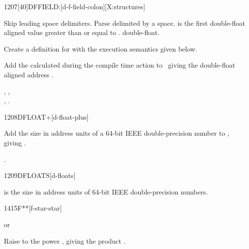 
\begin{worddef}{1207}[40]{DFFIELD:}[d-f-field-colon][X:structures]
\item {}

	Skip leading space delimiters. Parse  delimited by
	a space.  is the first double-float aligned value
	greater than or equal to .  
	double-float.

	Create a definition for  with the execution semantics
	given below.

\execute[name]
\cbstart{}
\cbend

	Add the  calculated during the compile time action to
\cbstart{}\cbend\ 
	giving the double-float aligned address
\cbstart{}.\cbend

\see {},
	, \\
	,
	.
\end{worddef}


\begin{worddef}{1208}{DFLOAT+}[d-float-plus]
\item {}

	Add the size in address units of a 64-bit IEEE double-precision
	number to , giving .

\see {}.
\end{worddef}


\begin{worddef}{1209}{DFLOATS}[d-floats]
\item {}

	 is the size in address units of  64-bit
	IEEE double-precision numbers.
\end{worddef}


\begin{worddef}{1415}{F**}[f-star-star]
\item {} or

	Raise  to the power , giving the product
	.
\end{worddef}


